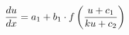 \documentclass[preview]{standalone}
\begin{document}
\begin{align*}
\special{dvisvgm:raw <g id='unique000'>}\frac{du}{dx} = a_1 + b_1 \cdot f\left( \frac{u + c_1}{k u + c_2} \right)\special{dvisvgm:raw </g>}
\end{align*}
\end{document}
